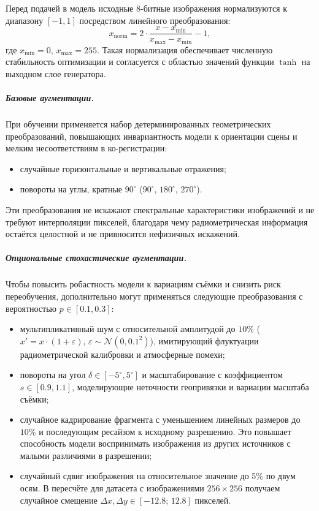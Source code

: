 Перед подачей в модель исходные 8-битные изображения нормализуются к диапазону $[-1, 1]$ посредством линейного преобразования:
\begin{equation}
    x_{\text{norm}} = 2 \cdot \frac{x - x_{\min}}{x_{\max} - x_{\min}} - 1,
    \label{eq:normalization}
\end{equation}
где $x_{\min}=0$, $x_{\max}=255$. Такая нормализация обеспечивает численную стабильность оптимизации и согласуется с областью значений функции $\tanh$ на выходном слое генератора.

\subparagraph{Базовые аугментации.}
При обучении применяется набор детерминированных геометрических преобразований, повышающих инвариантность модели к ориентации сцены и мелким несоответствиям в ко-регистрации:
\begin{itemize}
    \item случайные горизонтальные и вертикальные отражения;
    \item повороты на углы, кратные $90^\circ$ ($90^\circ$, $180^\circ$, $270^\circ$).
\end{itemize}
Эти преобразования не искажают спектральные характеристики изображений и не требуют интерполяции пикселей, благодаря чему радиометрическая информация остаётся целостной и не привносится нефизичных искажений.

\subparagraph{Опциональные стохастические аугментации.}
Чтобы повысить робастность модели к вариациям съёмки и снизить риск переобучения, дополнительно могут применяться следующие преобразования с вероятностью $p \in [0.1, 0.3]$:
\begin{itemize}
    \item мультипликативный шум с относительной амплитудой до $10\%$ ($x' = x \cdot (1 + \varepsilon)$, $\varepsilon \sim \mathcal{N}(0, 0.1^2)$), имитирующий флуктуации радиометрической калибровки и атмосферные помехи;
    \item повороты на угол $\delta \in [-5^\circ, 5^\circ]$ и масштабирование с коэффициентом $s \in [0.9, 1.1]$, моделирующие неточности геопривязки и вариации масштаба съёмки;
    \item случайное кадрирование фрагмента с уменьшением линейных размеров до $10\%$ и последующим ресайзом к исходному разрешению. Это повышает способность модели воспринимать изображения из других источников с малыми различиями в разрешении;
    \item случайный сдвиг изображения на относительное значение до 5\% по двум осям. В пересчёте для датасета с изображениями $256 \times 256$ получаем случайное смещение $\Delta x, \Delta y \in [-12.8;\, 12.8]$ пикселей.
\end{itemize}

